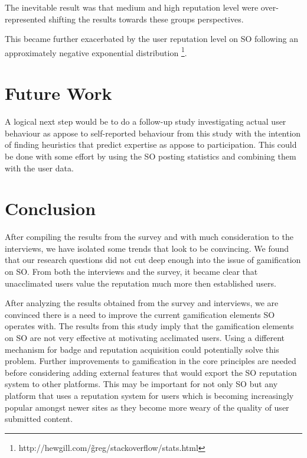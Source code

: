 \documentclass{sigchi}
\begin{document}
The inevitable result was that medium and high reputation level were over-represented shifting the results towards these groups perspectives.

This became further exacerbated by the user reputation level on SO following an approximately negative exponential distribution \footnote{http://hewgill.com/\~greg/stackoverflow/stats.html}. 



\section{Future Work}

A logical next step would be to do a follow-up study investigating actual user behaviour as appose to self-reported behaviour from this study with the intention of finding heuristics that predict expertise as appose to participation. This could be done with some effort by using the SO posting statistics and combining them with the user data.


\section{Conclusion}

After compiling the results from the survey and with much consideration to the interviews, we have isolated some trends that look to be convincing. We found that our research questions did not cut deep enough into the issue of gamification on SO. From both the interviews and the survey, it became clear that unacclimated users value the reputation much more then established users.

After analyzing the results obtained from the survey and interviews, we are convinced there is a need to improve the current gamification elements SO operates with. The results from this study imply that the gamification elements on SO are not very effective at motivating acclimated users. Using a different mechanism for badge and reputation acquisition could potentially solve this problem. Further improvements to gamification in the core principles are needed before considering adding external features that would export the SO reputation system to other platforms. This may be important for not only SO but any platform that uses a reputation system for users which is becoming increasingly popular amongst newer sites as they become more weary of the quality of user submitted content.


\nocite{*}  %


\end{document}
